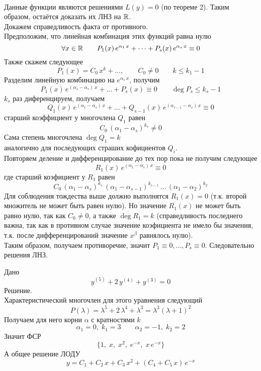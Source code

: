 \begin{Proof}~\\
    Данные функции являются решениями $L(y)=0$ (по теореме 2). Таким образом, остаётся доказать их ЛНЗ на $\mathbb{R}$.\\
    Докажем справедливость факта от противного.\\
    Предположим, что линейная комбинация этих функций равна нулю
    \[
        \forall x \in \mathbb{R} \qquad P_1(x)\,e^{\alpha_1\,x} + \dots + P_s(x)\,e^{\alpha_s\,x} \equiv 0
    \]
    Также скажем следующее
    \[
        P_1(x)=C_0\,x^k+\dots, \qquad C_0 \neq 0 \qquad k \leqslant k_1-1
    \]
    Разделим линейную комбинацию на $e^{\alpha_s\,x}$, получим 
    \[
        P_1(x)\,e^{(\alpha_1-\alpha_s)\,x}+\dots+P_s(x) \equiv 0 \qquad \deg P_s \leqslant k_s-1
    \]
    $k_s$ раз диференцируем, получаем
    \[
        Q_1(x)\,e^{(\alpha_1-\alpha_s)\,x} + \dots + Q_{s-1}(x)\,e^{(\alpha_{s-1} - \alpha_s)\, x} \equiv 0
    \]
    старший коэффициент у многочлена $Q_1$ равен
    \[ 
        C_0\,(\alpha_1-\alpha_s)^{k_s} \neq 0
    \]
    Сама степень многочлена $\deg Q_1 = k$\\
    аналогично для последующих страших кофициентов $Q_i$.\\
    Повторяем деление и дифференцирование до тех пор пока не получим следующее
    \[
        R_1(x)\,e^{(\alpha_1-\alpha_s)\,x} \equiv 0
    \]
    где старший коэфициент у $R_1$ равен
    \[
        C_0\,(\alpha_1-\alpha_s)^{k_s}\, (\alpha_1-\alpha_{s-1})^{k_{s-1}}\, \dots\, (\alpha_1-\alpha_2)^{k_2}
    \]
    Для соблюдения тождества выше должно выполнятся $R_1(x) = 0$ (т.к. второй множитель не может быть равен нулю). Но значение $R_1(x)$ не может быть равно нулю, так как $C_0 \neq 0$, а также $\deg R_1 = k$ (справедливость последнего важна, так как в противном случае значение коэфициента не имело бы значения, т.к. после дифференцирований значение $x^\beta$ равнялось нулю).\\
    Таким образом, получаем противоречие, значит $P_1\equiv 0, \dots, P_s\equiv 0$. Следовательно решения ЛНЗ.
\end{Proof}

\begin{Example}
    Дано
    \[
        y^{(5)}+2\,y^{(4)}+y^{(3)}=0
    \]
    Решение.\\
    Характеристический многочлен для этого уравнения следующий
    \[
        P(\lambda)=\lambda^5+2\,\lambda^4+\lambda^3=\lambda^3(\lambda+1)^2
    \]
    Получаем для него корни $\alpha$ с кратностями $k$
    \[
        \alpha_1=0,\; k_1=3 \qquad \alpha_2=-1,\; k_2=2
    \]
    Значит ФСР
    \[
        \{1,\; x,\; x^2,\; e^{-x},\; x\,e^{-x}\}
    \]
    А общее решение ЛОДУ
    \[
        y= C_1 + C_2\,x + C_3\,x^2 + (C_4 + C_5\,x)\,e^{-x}
    \]
\end{Example}